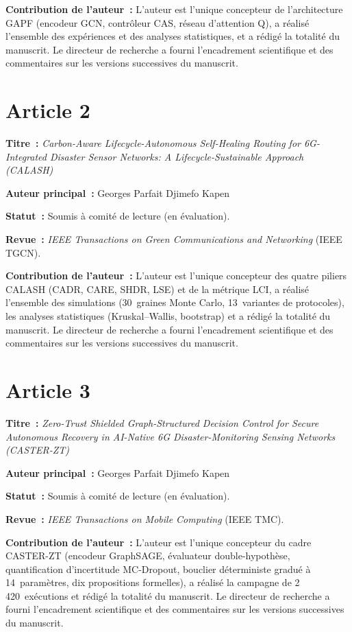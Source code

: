 {\smallskip
\noindent\textbf{Contribution de l'auteur~:} L'auteur est l'unique concepteur de
l'architecture GAPF (encodeur GCN, contrôleur CAS, réseau d'attention Q),
a réalisé l'ensemble des expériences et des analyses statistiques, et a rédigé
la totalité du manuscrit. Le directeur de recherche a fourni l'encadrement
scientifique et des commentaires sur les versions successives du manuscrit.

\section*{Article 2}

\noindent\textbf{Titre~:} \emph{Carbon-Aware Lifecycle-Autonomous Self-Healing
Routing for 6G-Integrated Disaster Sensor Networks: A Lifecycle-Sustainable
Approach (CALASH)}

\smallskip
\noindent\textbf{Auteur principal~:} Georges Parfait Djimefo Kapen

\smallskip
\noindent\textbf{Statut~:} Soumis à comité de lecture (en évaluation).

\smallskip
\noindent\textbf{Revue~:} \emph{IEEE Transactions on Green Communications and
Networking} (IEEE TGCN).

\smallskip
\noindent\textbf{Contribution de l'auteur~:} L'auteur est l'unique concepteur
des quatre piliers CALASH (CADR, CARE, SHDR, LSE) et de la métrique LCI,
a réalisé l'ensemble des simulations (30~graines Monte Carlo, 13~variantes
de protocoles), les analyses statistiques (Kruskal--Wallis, bootstrap) et
a rédigé la totalité du manuscrit. Le directeur de recherche a fourni
l'encadrement scientifique et des commentaires sur les versions successives
du manuscrit.

\section*{Article 3}

\noindent\textbf{Titre~:} \emph{Zero-Trust Shielded Graph-Structured Decision
Control for Secure Autonomous Recovery in AI-Native 6G Disaster-Monitoring
Sensing Networks (CASTER-ZT)}

\smallskip
\noindent\textbf{Auteur principal~:} Georges Parfait Djimefo Kapen

\smallskip
\noindent\textbf{Statut~:} Soumis à comité de lecture (en évaluation).

\smallskip
\noindent\textbf{Revue~:} \emph{IEEE Transactions on Mobile Computing} (IEEE TMC).

\smallskip
\noindent\textbf{Contribution de l'auteur~:} L'auteur est l'unique concepteur
du cadre CASTER-ZT (encodeur GraphSAGE, évaluateur double-hypothèse,
quantification d'incertitude MC-Dropout, bouclier déterministe gradué à
14~paramètres, dix propositions formelles), a réalisé la campagne de
2\,420~exécutions et rédigé la totalité du manuscrit. Le directeur de
recherche a fourni l'encadrement scientifique et des commentaires sur les
versions successives du manuscrit.

}